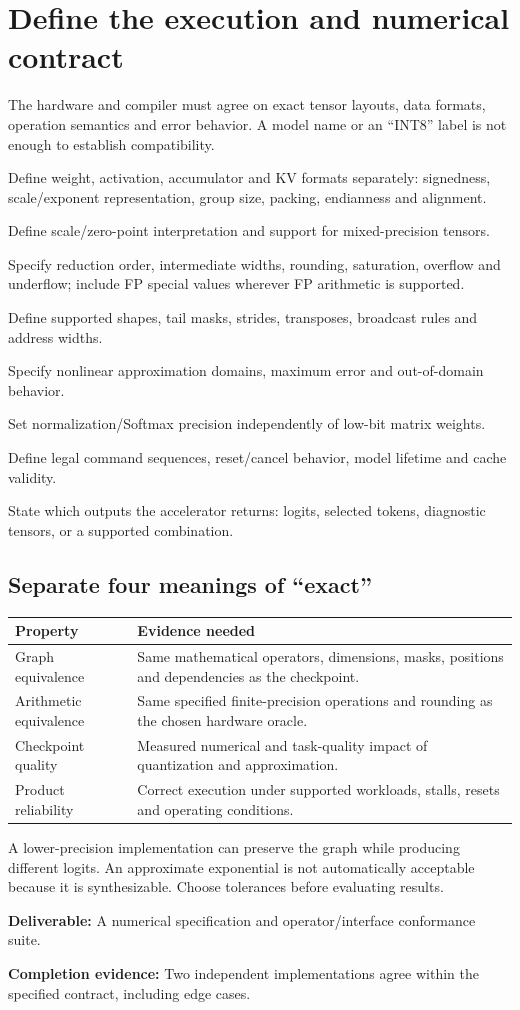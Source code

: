 \documentclass[11pt,a4paper]{article}
\newcommand{\phase}[2]{\clearpage\section{#1}\label{#2}}
\newcommand{\deliver}[2]{\begin{tcolorbox}[colback=pale,colframe=line,boxrule=0.5pt,arc=1mm,left=8pt,right=8pt,top=6pt,bottom=6pt]\textbf{Deliverable:} #1\par\textbf{Completion evidence:} #2\end{tcolorbox}}
\begin{document}
\phase{Define the execution and numerical contract}{sec:contract}
The hardware and compiler must agree on exact tensor layouts, data formats,
operation semantics and error behavior. A model name or an ``INT8'' label is
not enough to establish compatibility.
\begin{checklist}
\item Define weight, activation, accumulator and KV formats separately: signedness,
scale/exponent representation, group size, packing, endianness and alignment.
\item Define scale/zero-point interpretation and support for mixed-precision tensors.
\item Specify reduction order, intermediate widths, rounding, saturation, overflow
and underflow; include FP special values wherever FP arithmetic is supported.
\item Define supported shapes, tail masks, strides, transposes, broadcast rules and address widths.
\item Specify nonlinear approximation domains, maximum error and out-of-domain behavior.
\item Set normalization/Softmax precision independently of low-bit matrix weights.
\item Define legal command sequences, reset/cancel behavior, model lifetime and cache validity.
\item State which outputs the accelerator returns: logits, selected tokens, diagnostic tensors, or a supported combination.
\end{checklist}
\subsection*{Separate four meanings of ``exact''}
\begin{tabularx}{\linewidth}{@{}p{34mm}Y@{}}
\toprule\textbf{Property} & \textbf{Evidence needed}\\\midrule
Graph equivalence & Same mathematical operators, dimensions, masks, positions and dependencies as the checkpoint.\\
Arithmetic equivalence & Same specified finite-precision operations and rounding as the chosen hardware oracle.\\
Checkpoint quality & Measured numerical and task-quality impact of quantization and approximation.\\
Product reliability & Correct execution under supported workloads, stalls, resets and operating conditions.\\\bottomrule
\end{tabularx}
A lower-precision implementation can preserve the graph while producing
different logits. An approximate exponential is not automatically acceptable
because it is synthesizable. Choose tolerances before evaluating results.
\deliver{A numerical specification and operator/interface conformance suite.}{Two
independent implementations agree within the specified contract, including edge cases.}
\end{document}
